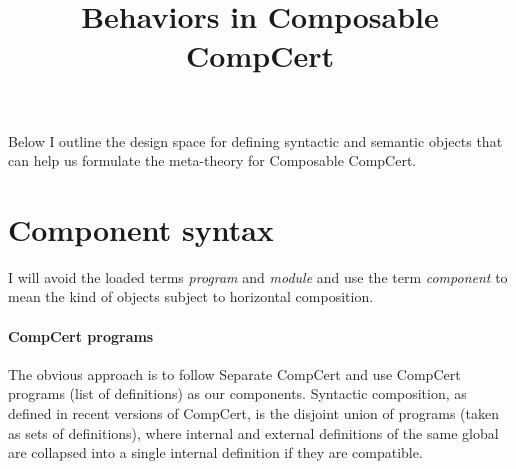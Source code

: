 \documentclass[11pt]{article}
\title{Behaviors in Composable CompCert}
\begin{document}
\maketitle

Below I outline the design space for
defining syntactic and semantic objects
that can help us
formulate the meta-theory for Composable CompCert.

%
%

\section{Component syntax} %

I will avoid the loaded terms \emph{program} and \emph{module}
and use the term \emph{component}
to mean the kind of objects subject to horizontal composition.

\paragraph{CompCert programs} %

The obvious approach is to follow Separate CompCert and
use CompCert programs (list of definitions) as our components.
Syntactic composition, as defined in recent versions of CompCert,
is the disjoint union of programs (taken as sets of definitions),
where internal and external definitions of the same global
are collapsed into a single internal definition
if they are compatible.
\end{document}
